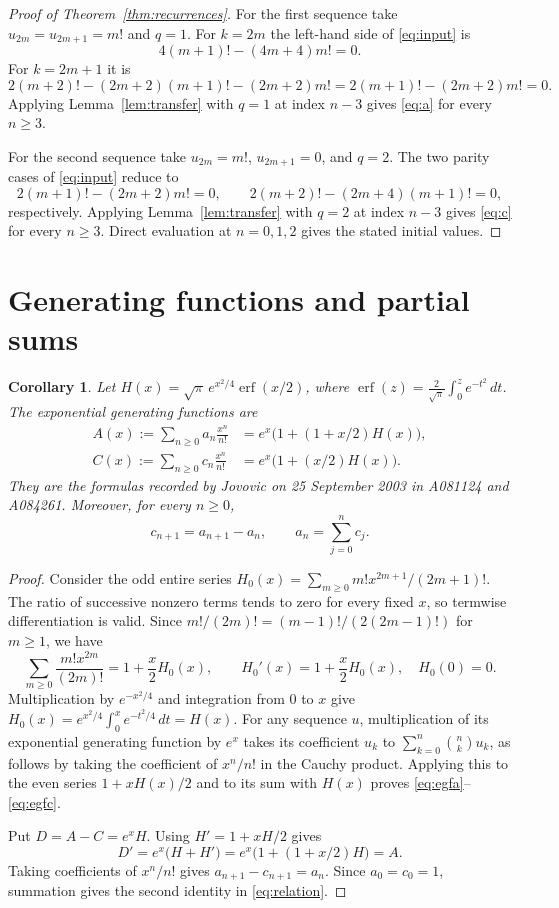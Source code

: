 \documentclass[11pt]{article}
\newtheorem{corollary}{Corollary}
\DeclareMathOperator{\erf}{erf}
\begin{document}
\begin{proof}[Proof of Theorem~\ref{thm:recurrences}]
For the first sequence take $u_{2m}=u_{2m+1}=m!$ and $q=1$.
For $k=2m$ the left-hand side of \eqref{eq:input} is
\[
 4(m+1)!-(4m+4)m!=0.
\]
For $k=2m+1$ it is
\[
 2(m+2)!-(2m+2)(m+1)!-(2m+2)m!
 =2(m+1)!-(2m+2)m!=0.
\]
Applying Lemma~\ref{lem:transfer} with $q=1$ at index $n-3$ gives
\eqref{eq:a} for every $n\geq3$.

For the second sequence take $u_{2m}=m!$, $u_{2m+1}=0$, and $q=2$.
The two parity cases of \eqref{eq:input} reduce to
\[
 2(m+1)!-(2m+2)m!=0,\qquad
 2(m+2)!-(2m+4)(m+1)!=0,
\]
respectively. Applying Lemma~\ref{lem:transfer} with $q=2$ at index
$n-3$ gives \eqref{eq:c} for every $n\geq3$.
Direct evaluation at $n=0,1,2$ gives the stated initial values.
\end{proof}

\section{Generating functions and partial sums}
\label{sec:egf}
\begin{corollary}\label{cor:egf}
Let $H(x)=\sqrt\pi\,e^{x^2/4}\erf(x/2)$, where
$\erf(z)=\frac{2}{\sqrt\pi}\int_0^z e^{-t^2}\,dt$.
The exponential generating functions are
\begin{align}
 A(x):=\sum_{n\geq0}a_n\frac{x^n}{n!}
 &=e^x\bigl(1+(1+x/2)H(x)\bigr),\label{eq:egfa}\\
 C(x):=\sum_{n\geq0}c_n\frac{x^n}{n!}
 &=e^x\bigl(1+(x/2)H(x)\bigr).\label{eq:egfc}
\end{align}
They are the formulas recorded by Jovovic on 25 September 2003
in A081124 and A084261. Moreover, for every $n\geq0$,
\begin{equation}\label{eq:relation}
 c_{n+1}=a_{n+1}-a_n,\qquad a_n=\sum_{j=0}^{n}c_j.
\end{equation}
\end{corollary}
\begin{proof}
Consider the odd entire series
$H_0(x)=\sum_{m\geq0}m!x^{2m+1}/(2m+1)!$.
The ratio of successive nonzero terms tends to zero for every fixed
$x$, so termwise differentiation is valid. Since
$m!/(2m)!=(m-1)!/(2(2m-1)!)$ for $m\geq1$, we have
\[
 \sum_{m\geq0}\frac{m!x^{2m}}{(2m)!}=1+\frac x2H_0(x),
 \qquad H_0'(x)=1+\frac x2H_0(x),\quad H_0(0)=0.
\]
Multiplication by $e^{-x^2/4}$ and integration from $0$ to $x$
give $H_0(x)=e^{x^2/4}\int_0^x e^{-t^2/4}\,dt=H(x)$.
For any sequence $u$, multiplication of its exponential generating
function by $e^x$ takes its coefficient $u_k$ to
$\sum_{k=0}^{n}\binom nk u_k$, as follows by taking the coefficient
of $x^n/n!$ in the Cauchy product. Applying this to the even series
$1+xH(x)/2$ and to its sum with $H(x)$ proves
\eqref{eq:egfa}--\eqref{eq:egfc}.

Put $D=A-C=e^xH$. Using $H'=1+xH/2$ gives
\[
 D'=e^x\bigl(H+H'\bigr)
    =e^x\bigl(1+(1+x/2)H\bigr)=A.
\]
Taking coefficients of $x^n/n!$ gives $a_{n+1}-c_{n+1}=a_n$.
Since $a_0=c_0=1$, summation gives the second identity in
\eqref{eq:relation}.
\end{proof}
\end{document}
